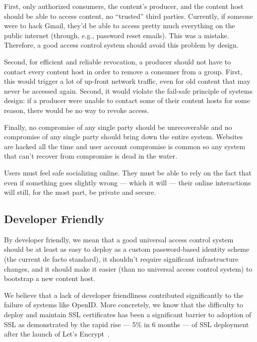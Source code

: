 \documentclass[pdftex,12pt,a4papaer,twoside,notitlepage]{report}
\begin{document}
First, only authorized consumers, the content's producer, and the content host
should be able to access content, no ``trusted'' third parties. Currently, if
someone were to hack Gmail, they'd be able to access pretty much everything on
the public internet (through, e.g., password reset emails). This was a mistake.
Therefore, a good access control system should avoid this problem by design.

Second, for efficient and reliable revocation, a producer should not have to
contact every content host in order to remove a consumer from a group. First,
this would trigger a lot of up-front network traffic, even for old content that
may never be accessed again. Second, it would violate the fail-safe principle of
systems design: if a producer were unable to contact some of their content hosts
for some reason, there would be no way to revoke access.

Finally, no compromise of any single party should be unrecoverable and no
compromise of any single party should bring down the entire system. Websites are
hacked all the time and user account compromise is common so any system that
can't recover from compromise is dead in the water.

Users must feel safe socializing online. They must be able to rely on the fact
that even if something goes slightly wrong --- which it will --- their online
interactions will still, for the most part, be private and secure.

\subsection{Developer Friendly}
\label{sub:goal-developer}

By developer friendly, we mean that a good universal access control system
should be at least as easy to deploy as a custom password-based identity scheme
(the current de facto standard), it shouldn't require significant infrastructure
changes, and it should make it easier (than no universal access control system)
to bootstrap a new content host.

We believe that a lack of developer friendliness contributed significantly to
the failure of systems like OpenID\cite{openid}. More concretely, we know that
the difficulty to deploy and maintain SSL certificates has been a significant
barrier to adoption of SSL as demonstrated by the rapid rise --- 5\% in 6 months
--- of SSL deployment after the launch of Let's Encrypt~\cite{lets-encrypt}.
\end{document}
